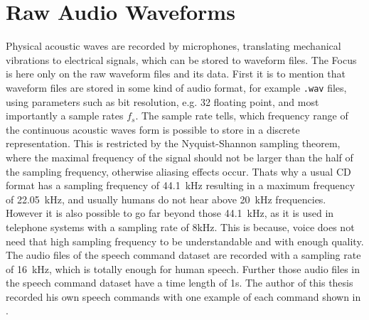 
\section{Raw Audio Waveforms}\label{sec:raw_audio}\label{sec:signal_raw}
Physical acoustic waves are recorded by microphones, translating mechanical vibrations to electrical signals, which can be stored to waveform files.
The Focus is here only on the raw waveform files and its data.
First it is to mention that waveform files are stored in some kind of audio format, for example \texttt{.wav} files, using parameters such as bit resolution, e.g. \SI{32}{\bit} floating point, and most importantly a sample rates $f_s$. 
The sample rate tells, which frequency range of the continuous acoustic waves form is possible to store in a discrete representation.
This is restricted by the Nyquist-Shannon sampling theorem, where the maximal frequency of the signal should not be larger than the half of the sampling frequency, otherwise aliasing effects occur. 
Thats why a usual CD format has a sampling frequency of \SI{44.1}{\kilo\hertz} resulting in a maximum frequency of \SI{22.05}{\kilo\hertz}, and usually humans do not hear above \SI{20}{\kilo\hertz} frequencies.
However it is also possible to go far beyond those \SI{44.1}{\kilo\hertz}, as it is used in telephone systems with a sampling rate of 8kHz.
This is because, voice does not need that high sampling frequency to be understandable and with enough quality.
The audio files of the speech command dataset are recorded with a sampling rate of \SI{16}{\kilo\hertz}, which is totally enough for human speech.
Further those audio files in the speech command dataset have a time length of 1s.
The author of this thesis recorded his own speech commands with one example of each command shown in .

